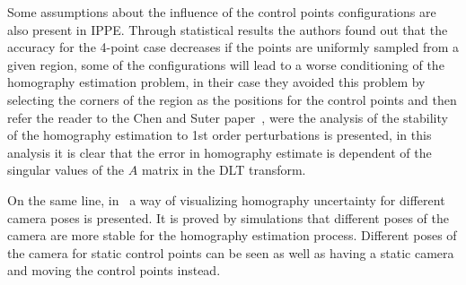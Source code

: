 \documentclass[letterpaper, 10 pt, conference]{ieeeconf}  %
\begin{document}
	
	
	Some assumptions about the influence of the control points configurations are also present in IPPE. Through statistical results the authors found out that the accuracy for the 4-point case decreases if the points are uniformly sampled from a given region, some of the configurations will lead to a worse conditioning of the homography estimation problem, in their case they avoided this problem by selecting the corners of the region as the positions for the control points and then refer the reader to the Chen and Suter paper~\cite{Chen2009}, were the analysis of the stability of the homography estimation to 1st order perturbations is presented, in this analysis it is clear that the error in homography estimate is dependent of the singular values of the $A$ matrix in the DLT transform.
	
	On the same line, in~\cite{Chung2014} a way of visualizing homography uncertainty for different camera poses is presented. It is proved by simulations that different poses of the camera are more stable for the homography estimation process. Different poses of the camera for static control points can be seen as well as having a static camera and moving the control points instead.
	
	
	
\end{document}
